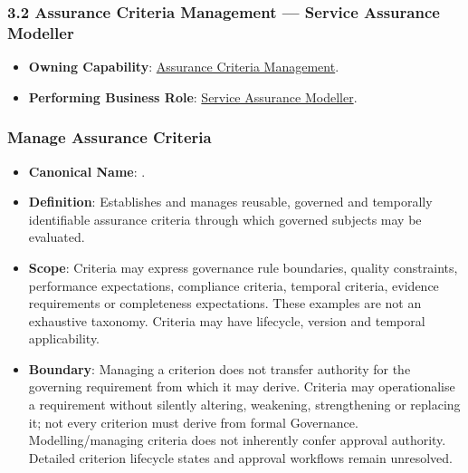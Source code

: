 \subsubsection*{3.2 Assurance Criteria Management — Service Assurance Modeller}
\label{rad:assurance:79}

\begin{itemize}

\item
\textbf{Owning Capability}: \hyperref[rad:enabling:686]{Assurance Criteria Management}.



\item
\textbf{Performing Business Role}: \href{https://github.com/fhirfactory/harmonia/blob/98410db60155198a75f74c79d98060070209faa1/docs/markdown/03-business-architecture/actors-roles/roles.md\#service-assurance-modeller}{Service Assurance Modeller}.



\end{itemize}
\label{rad:assurance:82}



\label{rad:assurance:84}
\subsubsection*{Manage Assurance Criteria}
\label{rad:assurance:86}

\begin{itemize}

\item
\textbf{Canonical Name}: \texttt{}.



\item
\textbf{Definition}: Establishes and manages reusable, governed and temporally identifiable assurance criteria through which governed subjects may be evaluated.



\item
\textbf{Scope}: Criteria may express governance rule boundaries, quality constraints, performance expectations, compliance criteria, temporal criteria, evidence requirements or completeness expectations. These examples are not an exhaustive taxonomy. Criteria may have lifecycle, version and temporal applicability.



\item
\textbf{Boundary}: Managing a criterion does not transfer authority for the governing requirement from which it may derive. Criteria may operationalise a requirement without silently altering, weakening, strengthening or replacing it; not every criterion must derive from formal Governance. Modelling/\allowbreak{}managing criteria does not inherently confer approval authority. Detailed criterion lifecycle states and approval workflows remain unresolved.



\end{itemize}
\label{rad:assurance:91}

